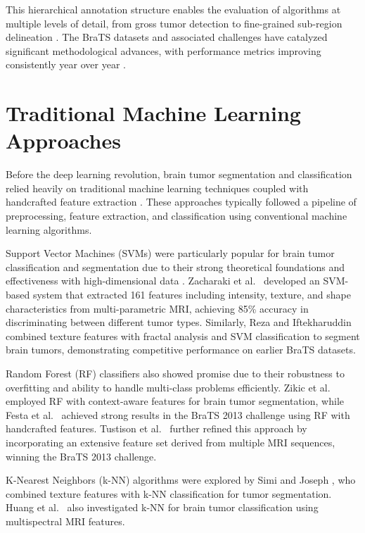 This hierarchical annotation structure enables the evaluation of algorithms at multiple levels of detail, from gross tumor detection to fine-grained sub-region delineation \cite{Bakas2018}. The BraTS datasets and associated challenges have catalyzed significant methodological advances, with performance metrics improving consistently year over year \cite{Isensee2021}.

\section{Traditional Machine Learning Approaches}

Before the deep learning revolution, brain tumor segmentation and classification relied heavily on traditional machine learning techniques coupled with handcrafted feature extraction \cite{Gordillo2013}. These approaches typically followed a pipeline of preprocessing, feature extraction, and classification using conventional machine learning algorithms.

Support Vector Machines (SVMs) were particularly popular for brain tumor classification and segmentation due to their strong theoretical foundations and effectiveness with high-dimensional data \cite{Bauer2011}. Zacharaki et al.\ \cite{Zacharaki2009} developed an SVM-based system that extracted 161 features including intensity, texture, and shape characteristics from multi-parametric MRI, achieving 85\% accuracy in discriminating between different tumor types. Similarly, Reza and Iftekharuddin \cite{Reza2013} combined texture features with fractal analysis and SVM classification to segment brain tumors, demonstrating competitive performance on earlier BraTS datasets.

Random Forest (RF) classifiers also showed promise due to their robustness to overfitting and ability to handle multi-class problems efficiently. Zikic et al.\ \cite{Zikic2012} employed RF with context-aware features for brain tumor segmentation, while Festa et al.\ \cite{Festa2013} achieved strong results in the BraTS 2013 challenge using RF with handcrafted features. Tustison et al.\ \cite{Tustison2015} further refined this approach by incorporating an extensive feature set derived from multiple MRI sequences, winning the BraTS 2013 challenge.

K-Nearest Neighbors (k-NN) algorithms were explored by Simi and Joseph \cite{Simi2014}, who combined texture features with k-NN classification for tumor segmentation. Huang et al.\ \cite{Huang2014} also investigated k-NN for brain tumor classification using multispectral MRI features.

